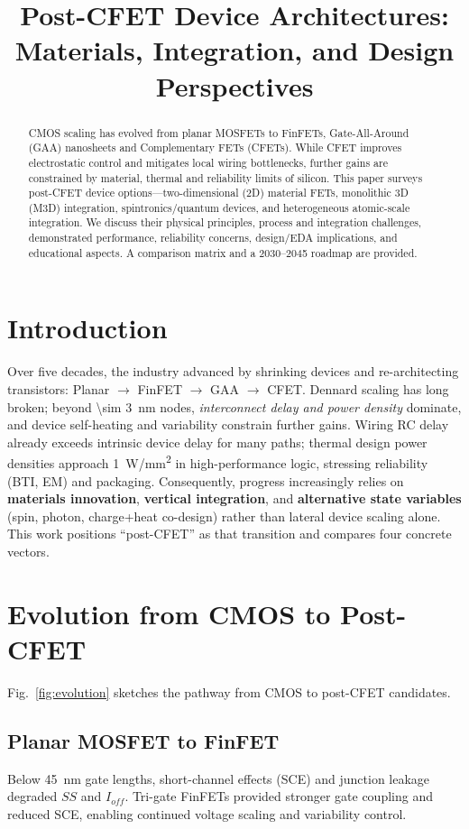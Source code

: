 \documentclass[conference]{IEEEtran}
\title{Post-CFET Device Architectures: Materials, Integration, and Design Perspectives}
\author{
\IEEEauthorblockN{Shinichi Samizo}
\IEEEauthorblockA{Independent Semiconductor Researcher\\
Project Design Hub, Samizo-AITL\\
\textit{Email:} \href{mailto:shin3t72@gmail.com}{shin3t72@gmail.com}\quad
\textit{GitHub:} \href{https://github.com/Samizo-AITL}{Samizo-AITL}}
}
\begin{document}
\maketitle

\begin{abstract}
CMOS scaling has evolved from planar MOSFETs to FinFETs, Gate-All-Around (GAA) nanosheets and Complementary FETs (CFETs).
While CFET improves electrostatic control and mitigates local wiring bottlenecks, further gains are constrained by material, thermal and reliability limits of silicon.
This paper surveys post-CFET device options---two-dimensional (2D) material FETs, monolithic 3D (M3D) integration, spintronics/quantum devices, and heterogeneous atomic-scale integration.
We discuss their physical principles, process and integration challenges, demonstrated performance, reliability concerns, design/EDA implications, and educational aspects.
A comparison matrix and a 2030--2045 roadmap are provided.
\end{abstract}

\section{Introduction}
Over five decades, the industry advanced by shrinking devices and re-architecting transistors: Planar $\rightarrow$ FinFET $\rightarrow$ GAA $\rightarrow$ CFET.
Dennard scaling has long broken; beyond \SI{\sim 3}{nm} nodes, \emph{interconnect delay and power density} dominate, and device self-heating and variability constrain further gains.
Wiring RC delay already exceeds intrinsic device delay for many paths; thermal design power densities approach \SI{1}{W/mm^2} in high-performance logic, stressing reliability (BTI, EM) and packaging.
Consequently, progress increasingly relies on \textbf{materials innovation}, \textbf{vertical integration}, and \textbf{alternative state variables} (spin, photon, charge+heat co-design) rather than lateral device scaling alone.
This work positions ``post-CFET'' as that transition and compares four concrete vectors.

\section{Evolution from CMOS to Post-CFET}
Fig.~\ref{fig:evolution} sketches the pathway from CMOS to post-CFET candidates.

\subsection{Planar MOSFET to FinFET}
Below \SI{45}{nm} gate lengths, short-channel effects (SCE) and junction leakage degraded $SS$ and $I_{off}$.
Tri-gate FinFETs provided stronger gate coupling and reduced SCE, enabling continued voltage scaling and variability control.
\end{document}

